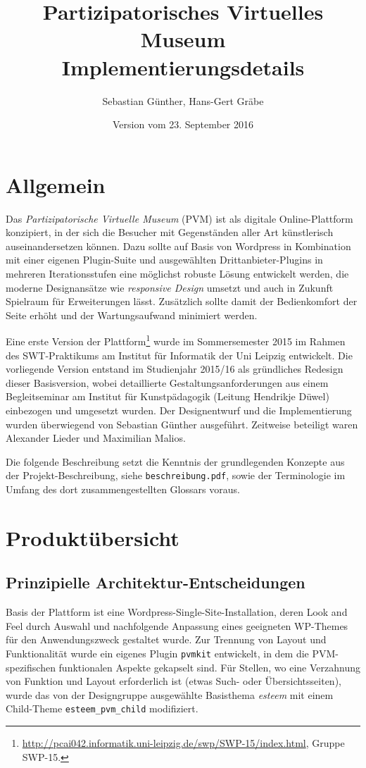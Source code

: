 \documentclass[a4paper,11pt]{article}
\title{Partizipatorisches Virtuelles Museum\\[.6em] Implementierungsdetails}
\date{Version vom 23. September 2016}
\author{Sebastian Günther, Hans-Gert Gräbe}
\begin{document}
\maketitle
\tableofcontents
\newpage
 
\section{Allgemein}
 
Das \emph{Partizipatorische Virtuelle Museum} (PVM) ist als digitale
Online-Plattform konzipiert, in der sich die Besucher mit Gegenständen aller
Art künstlerisch auseinandersetzen können. Dazu sollte auf Basis von Wordpress
in Kombination mit einer eigenen Plugin-Suite und ausgewählten
Drittanbieter-Plugins in mehreren Iterationsstufen eine möglichst robuste
Lösung entwickelt werden, die moderne Designansätze wie \emph{responsive
  Design} umsetzt und auch in Zukunft Spielraum für Erweiterungen lässt.
Zusätzlich sollte damit der Bedienkomfort der Seite erhöht und der
Wartungsaufwand minimiert werden.

Eine erste Version der
Plattform\footnote{\url{http://pcai042.informatik.uni-leipzig.de/swp/SWP-15/index.html},
  Gruppe SWP-15.} wurde im Sommersemester 2015 im Rahmen des SWT-Praktikums am
Institut für Informatik der Uni Leipzig entwickelt.  Die vorliegende Version
entstand im Studienjahr 2015/16 als gründliches Redesign dieser Basisversion,
wobei detaillierte Gestaltungsanforderungen aus einem Begleitseminar am
Institut für Kunstpädagogik (Leitung Hendrikje Düwel) einbezogen und umgesetzt
wurden.  Der Designentwurf und die Implementierung wurden überwiegend von
Sebastian Günther ausgeführt. Zeitweise beteiligt waren Alexander Lieder und
Maximilian Malios. 

Die folgende Beschreibung setzt die Kenntnis der grundlegenden Konzepte aus der
Projekt-Beschreibung, siehe \texttt{beschreibung.pdf}, sowie der Terminologie
im Umfang des dort zusammengestellten Glossars voraus.

\section{Produktübersicht}

\subsection{Prinzipielle Architektur-Entscheidungen}
 
Basis der Plattform ist eine Wordpress-Single-Site-Installation, deren Look and
Feel durch Auswahl und nachfolgende Anpassung eines geeigneten WP-Themes für
den Anwendungszweck gestaltet wurde.  Zur Trennung von Layout und
Funktionalität wurde ein eigenes Plugin \texttt{pvmkit} entwickelt, in dem die
PVM-spezifischen funktionalen Aspekte gekapselt sind. Für Stellen, wo eine
Verzahnung von Funktion und Layout erforderlich ist (etwas Such- oder
Übersichtsseiten), wurde das von der Designgruppe ausgewählte Basisthema
\emph{esteem} mit einem Child-Theme \texttt{esteem\_pvm\_child} modifiziert. 
\end{document}
